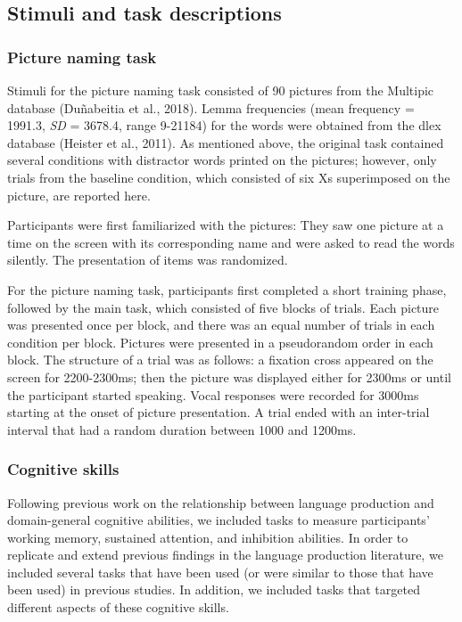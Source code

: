 \documentclass[
  man,floatsintext]{apa6}
\begin{document}
\hypertarget{stimuli-and-task-descriptions}{%
\subsection{Stimuli and task descriptions}\label{stimuli-and-task-descriptions}}

\hypertarget{picture-naming-task}{%
\subsubsection{Picture naming task}\label{picture-naming-task}}

Stimuli for the picture naming task consisted of 90 pictures from the Multipic database (Duñabeitia et al., 2018). Lemma frequencies (mean frequency = 1991.3, \emph{SD} = 3678.4, range 9-21184) for the words were obtained from the dlex database (Heister et al., 2011). As mentioned above, the original task contained several conditions with distractor words printed on the pictures; however, only trials from the baseline condition, which consisted of six Xs superimposed on the picture, are reported here.

Participants were first familiarized with the pictures: They saw one picture at a time on the screen with its corresponding name and were asked to read the words silently. The presentation of items was randomized.

For the picture naming task, participants first completed a short training phase, followed by the main task, which consisted of five blocks of trials. Each picture was presented once per block, and there was an equal number of trials in each condition per block. Pictures were presented in a pseudorandom order in each block. The structure of a trial was as follows: a fixation cross appeared on the screen for 2200-2300ms; then the picture was displayed either for 2300ms or until the participant started speaking. Vocal responses were recorded for 3000ms starting at the onset of picture presentation. A trial ended with an inter-trial interval that had a random duration between 1000 and 1200ms.

\hypertarget{cognitive-skills}{%
\subsubsection{Cognitive skills}\label{cognitive-skills}}

Following previous work on the relationship between language production and domain-general cognitive abilities, we included tasks to measure participants' working memory, sustained attention, and inhibition abilities. In order to replicate and extend previous findings in the language production literature, we included several tasks that have been used (or were similar to those that have been used) in previous studies. In addition, we included tasks that targeted different aspects of these cognitive skills.
\end{document}

